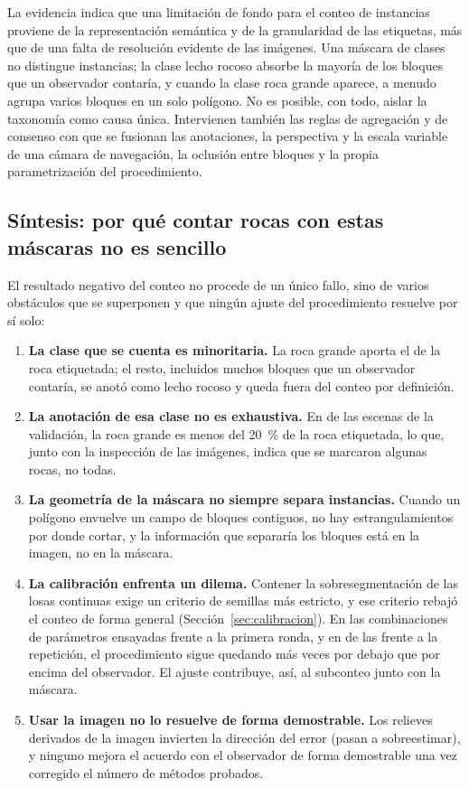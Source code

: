La evidencia indica que una limitación de fondo para el conteo de instancias proviene de la
representación semántica y de la granularidad de las etiquetas, más que de una falta de
resolución evidente de las imágenes. Una máscara de clases no distingue instancias; la clase
lecho rocoso absorbe la mayoría de los bloques que un observador contaría, y cuando la clase
roca grande aparece, a menudo agrupa varios bloques en un solo polígono. No es posible, con
todo, aislar la taxonomía como causa única. Intervienen también las reglas de agregación y de
consenso con que se fusionan las anotaciones, la perspectiva y la escala variable de una
cámara de navegación, la oclusión entre bloques y la propia parametrización del procedimiento.

\subsection{Síntesis: por qué contar rocas con estas máscaras no es sencillo}
\label{sec:sintesis-conteo}

El resultado negativo del conteo no procede de un único fallo, sino de varios obstáculos que se
superponen y que ningún ajuste del procedimiento resuelve por sí solo:

\begin{enumerate}
  \item \textbf{La clase que se cuenta es minoritaria.} La roca grande aporta el \cParteBig{} de
    la roca etiquetada; el resto, incluidos muchos bloques que un observador contaría, se anotó
    como lecho rocoso y queda fuera del conteo por definición.
  \item \textbf{La anotación de esa clase no es exhaustiva.} En \cVNoExhN{} de las \cVN{}
    escenas de la validación, la roca grande es menos del \SI{20}{\percent} de la roca
    etiquetada, lo que, junto con la inspección de las imágenes, indica que se marcaron
    algunas rocas, no todas.
  \item \textbf{La geometría de la máscara no siempre separa instancias.} Cuando un polígono
    envuelve un campo de bloques contiguos, no hay estrangulamientos por donde cortar, y la
    información que separaría los bloques está en la imagen, no en la máscara.
  \item \textbf{La calibración enfrenta un dilema.} Contener la sobresegmentación de las losas
    continuas exige un criterio de semillas más estricto, y ese criterio rebajó el conteo de
    forma general (Sección~\ref{sec:calibracion}). En las \cSenMasAbajo{} combinaciones de
    parámetros ensayadas frente a la primera ronda, y en \cSenSegMasAbajo{} de las
    \cSenSegN{} frente a la repetición, el procedimiento sigue quedando más veces por debajo que
    por encima del observador. El ajuste contribuye, así, al subconteo junto con la máscara.
  \item \textbf{Usar la imagen no lo resuelve de forma demostrable.} Los relieves derivados de la
    imagen invierten la dirección del error (pasan a sobreestimar), y ninguno mejora el
    acuerdo con el observador de forma demostrable una vez corregido el número de métodos
    probados.
\end{enumerate}

